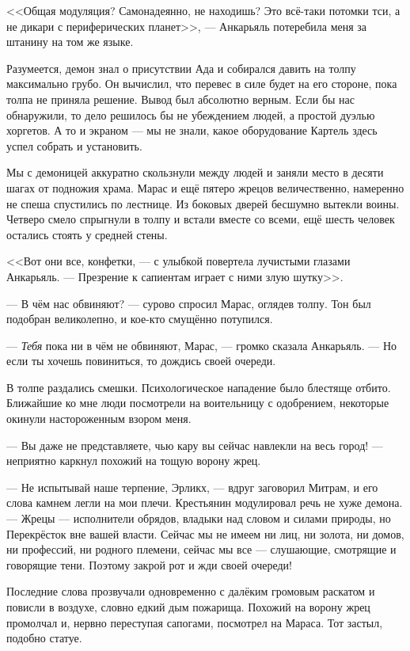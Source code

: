 <<Общая модуляция?
Самонадеянно, не находишь?
Это всё-таки потомки тси, а не дикари с периферических планет>>, --- Анкарьяль потеребила меня за штанину на том же языке.

Разумеется, демон знал о присутствии Ада и собирался давить на толпу максимально грубо.
Он вычислил, что перевес в силе будет на его стороне, пока толпа не приняла решение.
Вывод был абсолютно верным.
Если бы нас обнаружили, то дело решилось бы не убеждением людей, а простой дуэлью хоргетов.
А то и экраном --- мы не знали, какое оборудование Картель здесь успел собрать и установить.

Мы с демоницей аккуратно скользнули между людей и заняли место в десяти шагах от подножия храма.
Марас и ещё пятеро жрецов величественно, намеренно не спеша спустились по лестнице.
Из боковых дверей бесшумно вытекли воины.
Четверо смело спрыгнули в толпу и встали вместе со всеми, ещё шесть человек остались стоять у средней стены.

<<Вот они все, конфетки, --- с улыбкой повертела лучистыми глазами Анкарьяль.
--- Презрение к сапиентам играет с ними злую шутку>>.

--- В чём нас обвиняют? --- сурово спросил Марас, оглядев толпу.
Тон был подобран великолепно, и кое-кто смущённо потупился.

--- \emph{Тебя} пока ни в чём не обвиняют, Марас, --- громко сказала Анкарьяль.
--- Но если ты хочешь повиниться, то дождись своей очереди.

В толпе раздались смешки.
Психологическое нападение было блестяще отбито.
Ближайшие ко мне люди посмотрели на воительницу с одобрением, некоторые окинули настороженным взором меня.

--- Вы даже не представляете, чью кару вы сейчас навлекли на весь город! --- неприятно каркнул похожий на тощую ворону жрец.

--- Не испытывай наше терпение, Эрликх, --- вдруг заговорил Митрам, и его слова камнем легли на мои плечи.
Крестьянин модулировал речь не хуже демона.
--- Жрецы --- исполнители обрядов, владыки над словом и силами природы, но Перекрёсток вне вашей власти.
Сейчас мы не имеем ни лиц, ни золота, ни домов, ни профессий, ни родного племени, сейчас мы все --- слушающие, смотрящие и говорящие тени.
Поэтому закрой рот и жди своей очереди!

Последние слова прозвучали одновременно с далёким громовым раскатом и повисли в воздухе, словно едкий дым пожарища.
Похожий на ворону жрец промолчал и, нервно переступая сапогами, посмотрел на Мараса.
Тот застыл, подобно статуе.

